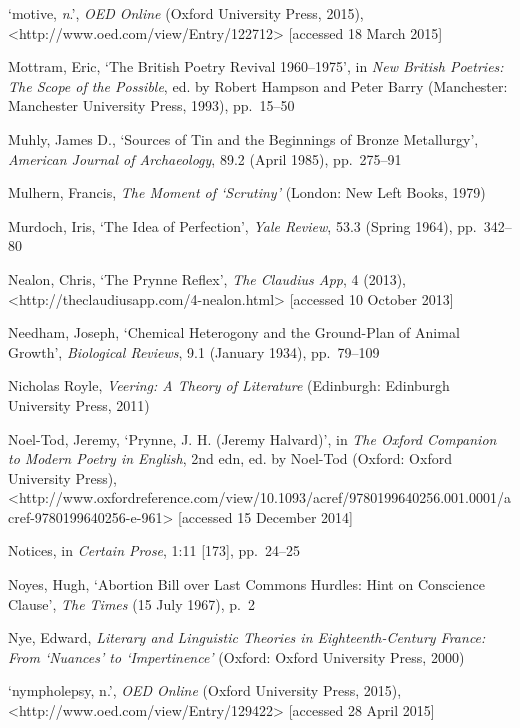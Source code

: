 \documentclass[]{article}
\begin{document}
`motive, \emph{n}.', \emph{OED Online} (Oxford University Press,
2015),\\
\textless{}http://www.oed.com/view/Entry/122712\textgreater{}
{[}accessed 18 March 2015{]}

Mottram, Eric, `The British Poetry Revival 1960--1975', in \emph{New
British Poetries: The Scope of the Possible}, ed. by Robert Hampson and
Peter Barry (Manchester: Manchester University Press, 1993), pp.~15--50

Muhly, James D., `Sources of Tin and the Beginnings of Bronze
Metallurgy', \emph{American Journal of Archaeology}, 89.2 (April 1985),
pp.~275--91

Mulhern, Francis, \emph{The Moment of `Scrutiny'} (London: New Left
Books, 1979)

Murdoch, Iris, `The Idea of Perfection', \emph{Yale Review}, 53.3
(Spring 1964), pp.~342--80

Nealon, Chris, `The Prynne Reflex', \emph{The Claudius App}, 4 (2013),\\
\textless{}http://theclaudiusapp.com/4-nealon.html\textgreater{}
{[}accessed 10 October 2013{]}

Needham, Joseph, `Chemical Heterogony and the Ground-Plan of Animal
Growth', \emph{Biological Reviews}, 9.1 (January 1934), pp.~79--109

Nicholas Royle, \emph{Veering: A Theory of Literature} (Edinburgh:
Edinburgh University Press, 2011)

Noel-Tod, Jeremy, `Prynne, J. H. (Jeremy Halvard)', in \emph{The Oxford
Companion to Modern Poetry in English}, 2nd edn, ed. by Noel-Tod
(Oxford: Oxford University Press),\\
\textless{}http://www.oxfordreference.com/view/10.1093/acref/9780199640256.001.0001/acref-9780199640256-e-961\textgreater{}
{[}accessed 15 December 2014{]}

Notices, in \emph{Certain Prose}, 1:11 {[}173{]}, pp.~24--25

Noyes, Hugh, `Abortion Bill over Last Commons Hurdles: Hint on
Conscience Clause', \emph{The Times} (15 July 1967), p.~2

Nye, Edward, \emph{Literary and Linguistic Theories in
Eighteenth-Century France: From `Nuances' to `Impertinence'} (Oxford:
Oxford University Press, 2000)

`nympholepsy, n.', \emph{OED Online} (Oxford University Press, 2015),\\
\textless{}http://www.oed.com/view/Entry/129422\textgreater{}
{[}accessed 28 April 2015{]}
\end{document}

